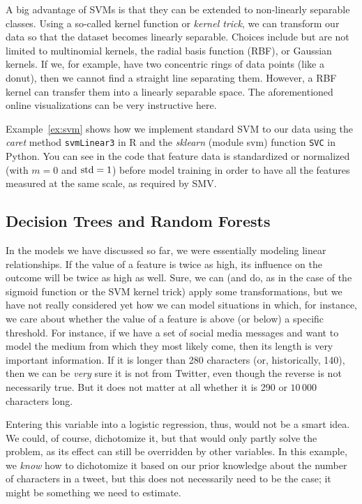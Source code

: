 A big advantage of SVMs is that they can be extended to non-linearly
separable classes. Using a so-called kernel function or \emph{kernel trick}, we can transform
our data so that the dataset becomes linearly separable. Choices
include but are not limited to multinomial kernels, the radial basis
function (RBF), or Gaussian kernels. If we, for example, have  two
concentric rings of data points (like a donut), then we cannot find a
straight line separating them. However, a RBF kernel can transfer them into
a linearly separable space. The aforementioned online visualizations
can be very instructive here.

Example~\ref{ex:svm} shows how we implement standard SVM to our data using the \emph{caret} method \texttt{svmLinear3} in R and the \emph{sklearn} (module svm) function \texttt{SVC} in Python. You can see in the code that feature data is standardized or normalized (with $m = 0$ and $\rm{std} = 1$) before model training in order to have all the features measured at the same scale, as required by SMV.




\subsection{Decision Trees and Random Forests} \label{subsec:randomforest}

In the models we have discussed so far, we were essentially modeling linear
relationships. If the value of a feature is twice as high, its
influence on the outcome will be twice as high as well.  Sure, we can
(and do, as in the case of the sigmoid function or the SVM kernel trick) apply some
transformations, but we have not really considered yet how we can
model situations in which, for instance, we care about whether the
value of a feature is above (or below) a specific threshold.  For
instance, if we have a set of social media messages and want to model
the medium from which they most likely come, then its length is very
important information. If it is longer than 280 characters (or,
historically, 140), then we can be \emph{very} sure it is not from
Twitter, even though the reverse is not necessarily true. But it does
not matter at all whether it is 290 or $10\,000$ characters long.

Entering this variable into a logistic regression, thus, would not be
a smart idea.  We could, of course, dichotomize it, but that would
only partly solve the problem, as its effect can still be overridden by other variables.  In this example, we \emph{know} how to
dichotomize it based on our prior knowledge about the number of
characters in a tweet, but this does not necessarily need to be the
case; it might be something we need to estimate.

